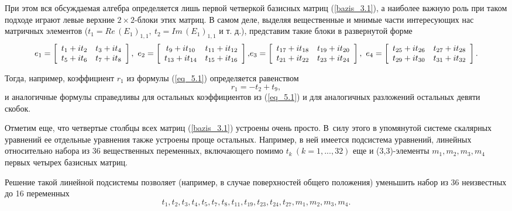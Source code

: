   При этом вся обсуждаемая алгебра определяется
лишь первой четверкой базисных матриц  (\ref{bazis_3.1}), а наиболее
важную роль при таком подходе играют левые верхние $2\times2$-блоки
этих матриц. В самом деле, выделяя вещественные и
мнимые части интересующих нас матричных элементов
($ t_1= Re\,(E_1)_{1,1}, \ t_2= Im\,(E_1)_{1,1} $ и т. д.), представим такие
блоки в развернутой форме
\begin{equation}
e_1=
\left[ \begin {array}{cc}
t_1+it_2 & t_3+it_4 \\
t_5+it_6 & t_7+it_8
\end{array}\right],
\
e_2=
\left[ \begin {array}{cc}
t_9+it_{10} & t_{11}+it_{12} \\
t_{13}+it_{14} & t_{15}+it_{16}
\end{array}\right],
$$
$$
e_3=
\left[ \begin {array}{cc}
t_{17}+it_{18} & t_{19}+it_{20} \\
t_{21}+it_{22} & t_{23}+it_{24}
\end{array}\right],
\
e_4=
\left[ \begin {array}{cc}
t_{25}+it_{26} & t_{27}+it_{28} \\
t_{29}+it_{30} & t_{31}+it_{32}
\end{array}\right].
\end{equation}

  Тогда, например, коэффициент $ r_1 $ из формулы  (\ref{eq_5.1}) определяется равенством
$$
 r_1 = -t_2 + t_9,
$$
и аналогичные формулы справедливы для остальных коэффициентов из  (\ref{eq_5.1}) и для аналогичных
разложений остальных девяти скобок.

   Отметим еще, что четвертые столбцы всех матриц (\ref{bazis_3.1}) устроены очень просто.
В~силу этого в
упомянутой системе скалярных уравнений ее отдельные уравнения также
устроены проще остальных.
Например, в ней имеется подсистема уравнений,
линейных относительно набора из 36 вещественных
переменных, включающего помимо $ t_k \ (k = 1,..., 32) $ еще и (3,3)-элементы
$ m_1, m_2, m_3, m_4 $ первых четырех базисных матриц.

  Решение такой линейной подсистемы позволяет (например, в случае
поверхностей общего положения) уменьшить набор из 36 неизвестных до 16
переменных
\begin{equation}
   t_1, t_2, t_3, t_4, t_5, t_7, t_8, t_{11}, t_{19},t_{23}, t_{24}, t_{27}, m_1,m_2, m_3, m_4. \label{nabor_7.1}
\end{equation}


